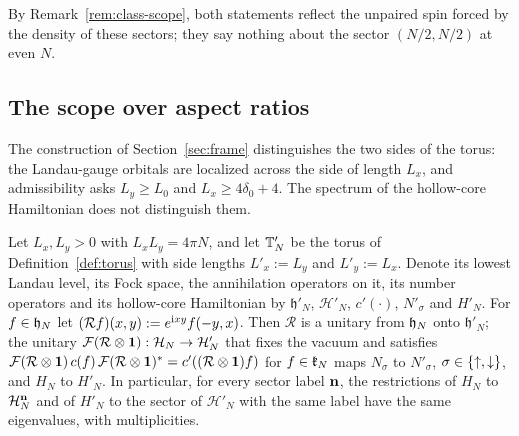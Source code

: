 By Remark~\ref{rem:class-scope}, both statements reflect the unpaired spin forced by the density of these sectors;
they say nothing about the sector $(N/2,N/2)$ at even $N$.

\subsection{The scope over aspect ratios}

The construction of Section~\ref{sec:frame} distinguishes the two sides of the torus: the Landau-gauge orbitals are
localized across the side of length $L_x$, and admissibility asks $L_y\ge L_0$ and $L_x\ge4\delta_0+4$. The spectrum of
the hollow-core Hamiltonian does not distinguish them.

\begin{lemma}\label{lem:exchange}
Let $L_x,L_y>0$ with $L_xL_y=4\pi N$, and let $\mathbb{T}'_N$ be the torus of Definition~\ref{def:torus} with side lengths
$L'_x:=L_y$ and $L'_y:=L_x$. Denote its lowest Landau level, its Fock space, the annihilation operators on it, its number
operators and its hollow-core Hamiltonian by $\mathfrak h'_N$, $\mathcal H'_N$, $c'(\cdot)$, $N'_\sigma$ and $H'_N$. For
$f\in\mathfrak{h}_N$ let $(\mathcal Rf)(x,y):=e^{\mathrm{i} xy}f(-y,x)$. Then $\mathcal R$ is a unitary from $\mathfrak{h}_N$ onto $\mathfrak h'_N$; the
unitary $\mathcal{F}(\mathcal R\otimes\mathbf{1}):\mathcal{H}_N\to\mathcal H'_N$ that fixes the vacuum and satisfies
$\mathcal{F}(\mathcal R\otimes\mathbf{1})\,c(f)\,\mathcal{F}(\mathcal R\otimes\mathbf{1})^*=c'((\mathcal R\otimes\mathbf{1})f)$ for $f\in\mathfrak{k}_N$ maps $N_\sigma$ to
$N'_\sigma$, $\sigma\in\{{\uparrow},{\downarrow}\}$, and $H_N$ to $H'_N$. In particular, for every sector label $\mathbf{n}$, the restrictions of
$H_N$ to $\mathcal{H}_N^{\mathbf{n}}$ and of $H'_N$ to the sector of $\mathcal H'_N$ with the same label have the same eigenvalues, with
multiplicities.
\end{lemma}

